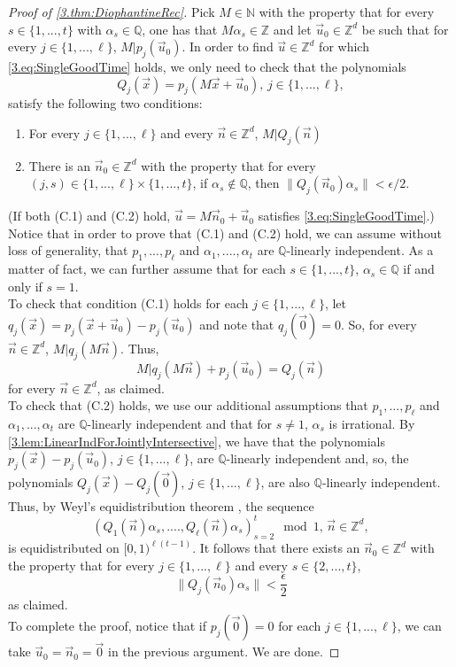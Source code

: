 \documentclass[11pt,american,preprint]{elsarticle}
\numberwithin{equation}{section}
\theoremstyle{plain}
\theoremstyle{plain*}
\theoremstyle{plain}
\theoremstyle{plain*}
\theoremstyle{plain}
\theoremstyle{plain*}
\theoremstyle{remark}
\theoremstyle{remark*}
\theoremstyle{remark}
\theoremstyle{remark*}
\theoremstyle{remark}
\theoremstyle{remark*}
\theoremstyle{plain}
\theoremstyle{definition}
\theoremstyle{plain}
\theoremstyle{plain} %
\newcommand{\N}{\mathbb{N}}
\newcommand{\Q}{\mathbb{Q}}
\newcommand{\Z}{\mathbb{Z}}
\begin{document}
\begin{proof}[Proof of \cref{3.thm:DiophantineRec}]
  Pick $M\in\N$ with the property that for every $s\in\{1,...,t\}$ with $\alpha_s\in \Q$, one has that $M\alpha_s\in\Z$ and let $\vec u_0\in\Z^d$ be such that for every $j\in\{1,...,\ell\}$, $M|p_j(\vec u_0)$. In order to  find $\vec u\in\Z^d$ for which \eqref{3.eq:SingleGoodTime} holds, we only need to check that the polynomials
  $$
Q_j(\vec x)=p_j(M\vec x+\vec u_0),\,j\in\{1,...,\ell\},
  $$
satisfy the following two conditions:
 \begin{enumerate}
     \item [(C.1)] For every $j\in\{1,...,\ell\}$ and every $\vec n\in\Z^d$, $M|Q_j(\vec n)$
     \item [(C.2)] There is an $\vec n_0\in \Z^d$ with the property that for every $(j,s)\in\{1,...,\ell\}\times\{1,...,t\}$, if $\alpha_s\not\in\Q$, then $\|Q_j(\vec n_0)\alpha_s\|<\epsilon/2$.
 \end{enumerate}
 (If both (C.1) and (C.2) hold, $\vec u=M\vec n_0+\vec u_0$ satisfies \eqref{3.eq:SingleGoodTime}.)\\
 Notice that in order to prove that (C.1) and (C.2) hold, we can assume  without loss of generality,  that $p_1,...,p_\ell$ and $\alpha_1,....,\alpha_t$ are $\Q$-linearly independent. As a matter of fact, we can further assume that for each $s\in\{1,...,t\}$, $\alpha_s\in\Q$ if and only if $s=1$.\\ 

To check that condition (C.1) holds for each $j\in\{1,...,\ell\}$, let $q_j(\vec x)=p_j(\vec x+\vec u_0)-p_j(\vec u_0)$ and note that $q_j(\vec 0)=0$. So, for every $\vec n\in\Z^d$, $M|q_j(M\vec n)$. Thus,
$$
M|q_j(M\vec n)+p_j(\vec u_0)=Q_j(\vec n)
$$
for every $\vec n\in\Z^d$, as claimed.\\

To check that (C.2) holds, we use our additional assumptions that $p_1,...,p_\ell$ and $\alpha_1,...,\alpha_t$ are $\Q$-linearly independent and that for $s\neq 1$, $\alpha_s$ is irrational. By \cref{3.lem:LinearIndForJointlyIntersective}, we have that the polynomials $p_j(\vec x)-p_j({\vec u}_0)$, $j\in\{1,...,\ell\}$, are $\Q$-linearly independent and, so, the polynomials $Q_j(\vec x)-Q_j(\vec 0)$, $j\in\{1,...,\ell\}$, are also $\Q$-linearly independent. Thus, by Weyl's equidistribution theorem \cite{weyl1916Mod1}, the  sequence  
$$
(Q_1(\vec n)\alpha_s,....,Q_\ell(\vec n)\alpha_s)_{s=2}^t\mod 1,\,\vec n\in\Z^d,
$$
is equidistributed on $[0,1)^{\ell (t-1)}$. It follows that there exists an ${\vec n_0}\in\Z^d$ with the property that for every $j\in\{1,...,\ell\}$ and every $s\in\{2,...,t\}$,
$$
\| Q_j({\vec n_0})\alpha_s\|<\frac{\epsilon}{2}
$$
as claimed.\\
To complete the proof, notice that if $p_j(\vec 0)=0$ for each $j\in\{1,...,\ell\}$, we can take $\vec u_0=\vec n_0=\vec 0$ in the previous argument. We are done. 
\end{proof}
\end{document}

